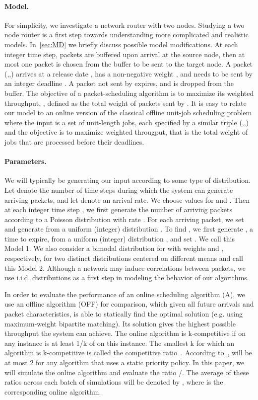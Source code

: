 \documentclass[oribibl]{llncs}
\begin{document}
\paragraph {Model.} For simplicity, we investigate a network router with
two nodes.   Studying a two node router is a first step towards understanding
more complicated and realistic models.
In~\ref{sec:MD} we briefly discuss possible model
modifications. At each integer time step, packets are buffered upon
arrival at the source node, then at most one packet is chosen from the
buffer to be sent to the target node. A packet (,,) arrives
at a release date , has a non-negative weight , and needs to be
sent by an integer deadline . A packet not sent by  expires, and
is dropped from the buffer.  The objective of a packet-scheduling
algorithm  is to maximize its weighted throughput, ,
defined as the total weight of packets sent by . It is easy to
relate our model to an online version of the classical offline  unit-job
scheduling problem where the input is a set of
 unit-length jobs, each specified by a similar triple (,,)
and the objective is to maximize weighted througput, that is the total weight 
of jobs that are processed before their deadlines.


\paragraph {Parameters.} 
We will typically be generating our input according to some type of
distribution. Let  denote the number of time steps during which
the system can generate arriving packets, and let  denote an
arrival rate. We choose values for  and . Then at 
each integer time step , we first
generate the number of arriving packets according to a Poisson
distribution with rate . For each arriving packet, we set
 and generate  from a uniform (integer) distribution
. To find , we first generate
, a time to expire, from a uniform (integer) distribution ,
and set . We call this Model 1. We also consider a bimodal distribution for  with
weights  and , respectively, for two distinct distributions
centered on different means and call this Model 2. Although a network
may induce correlations between packets,  we use i.i.d. distributions as a first
step in modeling the behavior of our algorithms. 

In order to evaluate the performance of an online scheduling algorithm
(A), we use an offline algorithm (OFF) for comparison, which given all
future arrivals and packet characteristics, is able to statically find
the optimal solution (e.g. using maximum-weight bipartite
matching). Its solution gives the highest possible throughput the
system can achieve. The online algorithm is k-competitive if
 on any instance is at least 1/k of  on this
instance. The smallest k for which an algorithm is k-competitive is
called the competitive ratio~\cite{borodin98}. According
to~\cite{hajek01},  will be at most 2 for any algorithm that uses a
static priority policy. In this paper, we will simulate the online
algorithm and evaluate the ratio /. The
average of these ratios across each batch of simulations will be
denoted by , where  is the corresponding online algorithm.
\end{document}
